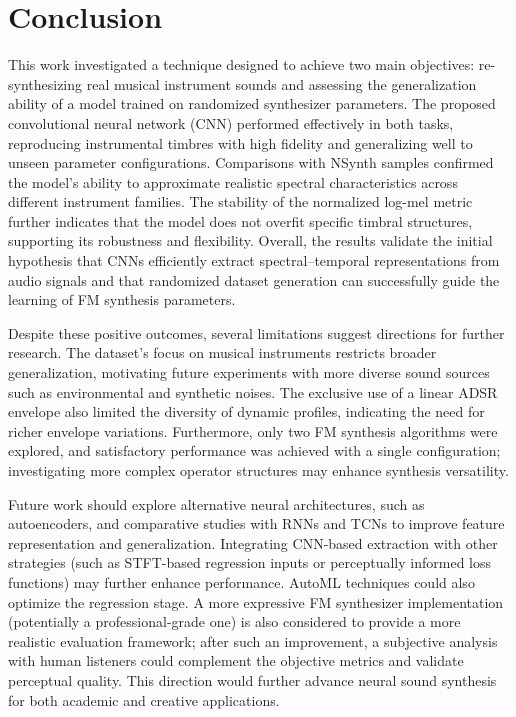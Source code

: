 \documentclass[10pt,conference]{IEEEtran}
\begin{document}
\section{Conclusion} \label{sec:conclusion}

This work investigated a technique designed to achieve two main objectives: re-synthesizing real musical instrument sounds and assessing the generalization ability of a model trained on randomized synthesizer parameters. The proposed convolutional neural network (CNN) performed effectively in both tasks, reproducing instrumental timbres with high fidelity and generalizing well to unseen parameter configurations. Comparisons with NSynth samples confirmed the model’s ability to approximate realistic spectral characteristics across different instrument families. The stability of the normalized log-mel metric further indicates that the model does not overfit specific timbral structures, supporting its robustness and flexibility. Overall, the results validate the initial hypothesis that CNNs efficiently extract spectral–temporal representations from audio signals and that randomized dataset generation can successfully guide the learning of FM synthesis parameters.

Despite these positive outcomes, several limitations suggest directions for further research. The dataset’s focus on musical instruments restricts broader generalization, motivating future experiments with more diverse sound sources such as environmental and synthetic noises. The exclusive use of a linear ADSR envelope also limited the diversity of dynamic profiles, indicating the need for richer envelope variations. Furthermore, only two FM synthesis algorithms were explored, and satisfactory performance was achieved with a single configuration; investigating more complex operator structures may enhance synthesis versatility.

Future work should explore alternative neural architectures, such as autoencoders, and comparative studies with RNNs and TCNs to improve feature representation and generalization. Integrating CNN-based extraction with other strategies (such as STFT-based regression inputs or perceptually informed loss functions) may further enhance performance. AutoML techniques could also optimize the regression stage. A more expressive FM synthesizer implementation (potentially a professional-grade one) is also considered to provide a more realistic evaluation framework; after such an improvement, a subjective analysis with human listeners could complement the objective metrics and validate perceptual quality. This direction would further advance neural sound synthesis for both academic and creative applications.

\balance



\end{document}
